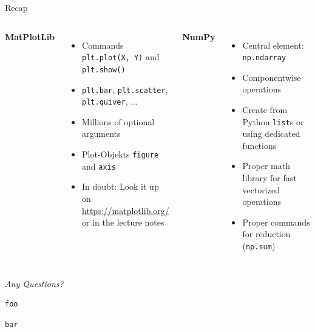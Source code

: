 
\begin{frame}[t,plain]
\titlepage
\end{frame}


\begin{frame}{Recap}
%
\begin{columns}[T]
\textbf{MatPlotLib}
\begin{itemize}
\item Commands \texttt{plt.plot(X, Y)} and \texttt{plt.show()}
\item \texttt{plt.bar}, \texttt{plt.scatter}, \texttt{plt.quiver}, ...
\item Millions of optional arguments
\item Plot-Objekts \texttt{figure} and \texttt{axis}
\item In doubt: Look it up on \url{https://matplotlib.org/} or in the lecture notes
\end{itemize}
%
\textbf{NumPy}
\begin{itemize}
\item Central element: \texttt{np.ndarray}
\item Componentwise operations
\item Create from Python \texttt{list}s or using dedicated functions
\item Proper math library for fast vectorized operations
\item Proper commands for reduction (\eg \texttt{np.sum})
\end{itemize}

\end{columns}
%
\begin{center}
	\emph{Any Questions?}
\end{center}
%
\end{frame}


\begin{frame}[fragile]
%
\begin{tcbraster}[raster columns=2,
                  raster equal height,
                  nobeforeafter,
                  raster column skip=0.5cm]
\begin{codebox}
\begin{verbatim}
foo
\end{verbatim}
\end{codebox}
%
\begin{codebox}
\begin{verbatim}
bar
\end{verbatim}
\end{codebox}
\end{tcbraster}
%
\end{frame}

